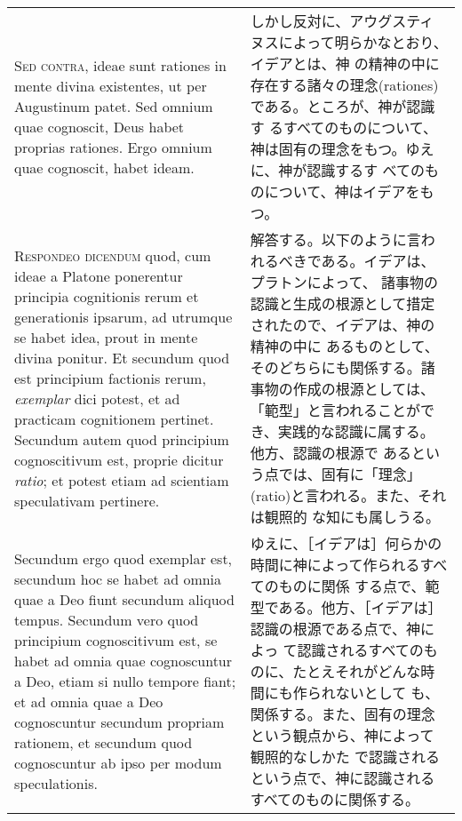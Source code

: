 \documentclass[10pt]{jsarticle} %
\begin{document}
\begin{longtable}{p{21em}p{21em}}
\\


{\scshape Sed contra}, ideae sunt rationes in mente divina existentes,
ut per Augustinum patet. Sed omnium quae cognoscit, Deus habet
proprias rationes. Ergo omnium quae cognoscit, habet ideam.


&

 しかし反対に、アウグスティヌスによって明らかなとおり、イデアとは、神
 の精神の中に存在する諸々の理念(rationes)である。ところが、神が認識す
 るすべてのものについて、神は固有の理念をもつ。ゆえに、神が認識するす
 べてのものについて、神はイデアをもつ。

\\

{\scshape Respondeo dicendum} quod, cum ideae a Platone ponerentur
principia cognitionis rerum et generationis ipsarum, ad utrumque se
habet idea, prout in mente divina ponitur. Et secundum quod est
principium factionis rerum, {\itshape exemplar} dici potest, et ad
practicam cognitionem pertinet. Secundum autem quod principium
cognoscitivum est, proprie dicitur {\itshape ratio}; et potest etiam
ad scientiam speculativam pertinere.


&

解答する。以下のように言われるべきである。イデアは、プラトンによって、
諸事物の認識と生成の根源として措定されたので、イデアは、神の精神の中に
あるものとして、そのどちらにも関係する。諸事物の作成の根源としては、
「範型」と言われることができ、実践的な認識に属する。他方、認識の根源で
あるという点では、固有に「理念」(ratio)と言われる。また、それは観照的
な知にも属しうる。

\\

Secundum ergo quod exemplar est, secundum hoc se habet ad omnia quae a
Deo fiunt secundum aliquod tempus. Secundum vero quod principium
cognoscitivum est, se habet ad omnia quae cognoscuntur a Deo, etiam si
nullo tempore fiant; et ad omnia quae a Deo cognoscuntur secundum
propriam rationem, et secundum quod cognoscuntur ab ipso per modum
speculationis.

&

ゆえに、［イデアは］何らかの時間に神によって作られるすべてのものに関係
する点で、範型である。他方、［イデアは］認識の根源である点で、神によっ
て認識されるすべてのものに、たとえそれがどんな時間にも作られないとして
も、関係する。また、固有の理念という観点から、神によって観照的なしかた
で認識されるという点で、神に認識されるすべてのものに関係する。

\\



\end{longtable}
\end{document}
